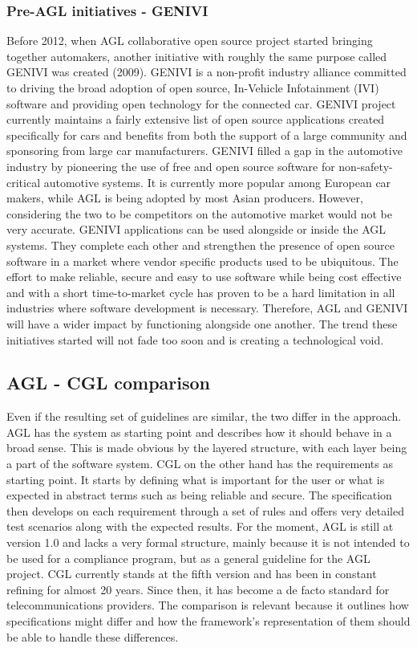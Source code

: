 \subsubsection*{Pre-AGL initiatives - GENIVI}
Before 2012, when AGL collaborative open source project started bringing together automakers, another initiative with roughly the same purpose called GENIVI was created (2009). GENIVI is a non-profit industry alliance committed to driving the broad adoption of open source, In-Vehicle Infotainment (IVI) software and providing open technology for the connected car. GENIVI project currently maintains a fairly extensive list of open source applications created specifically for cars and benefits from both the support of a large community and sponsoring from large car manufacturers. GENIVI filled a gap in the automotive industry by pioneering the use of free and open source software for non-safety-critical automotive systems. It is currently more popular among European car makers, while AGL is being adopted by most Asian producers. However, considering the two to be competitors on the automotive market would not be very accurate. GENIVI applications can be used alongside or inside the AGL systems. They complete each other and strengthen the presence of open source software in a market where vendor specific products used to be ubiquitous. The effort to make reliable, secure and easy to use software while being cost effective and with a short time-to-market cycle has proven to be a hard limitation in all industries where software development is necessary. Therefore, AGL and GENIVI will have a wider impact by functioning alongside one another. The trend these initiatives started will not fade too soon and is creating a technological void.

\subsection{AGL - CGL comparison}
Even if the resulting set of guidelines are similar, the two differ in the approach. AGL has the system as starting point and describes how it should behave in a broad sense. This is made obvious by the layered structure, with each layer being a part of the software system. CGL on the other hand has the requirements as starting point. It starts by defining what is important for the user or what is expected in abstract terms such as being reliable and secure. The specification then develops on each requirement through a set of rules and offers very detailed test scenarios along with the expected results. For the moment, AGL is still at version 1.0 and lacks a very formal structure, mainly because it is not intended to be used for a compliance program, but as a general guideline for the AGL project. CGL currently stands at the fifth version and has been in constant refining for almost 20 years. Since then, it has become a de facto standard for telecommunications providers. The comparison is relevant because it outlines how specifications might differ and how the framework's representation of them should be able to handle these differences. 

